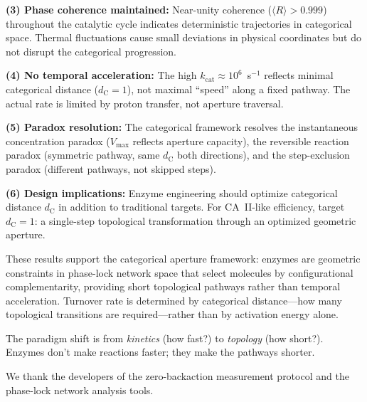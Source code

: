 \documentclass[twocolumn,amsmath,amssymb,aps,prb,superscriptaddress,longbibliography]{revtex4-2}
\newcommand{\dC}{d_{\mathrm{C}}}
\newcommand{\kcat}{k_{\mathrm{cat}}}
\newcommand{\Vmax}{V_{\mathrm{max}}}
\begin{document}
\textbf{(3) Phase coherence maintained:} Near-unity coherence ($\langle R \rangle > 0.999$) throughout the catalytic cycle indicates deterministic trajectories in categorical space. Thermal fluctuations cause small deviations in physical coordinates but do not disrupt the categorical progression.

\textbf{(4) No temporal acceleration:} The high $\kcat \approx 10^6$~s$^{-1}$ reflects minimal categorical distance ($\dC = 1$), not maximal ``speed'' along a fixed pathway. The actual rate is limited by proton transfer, not aperture traversal.

\textbf{(5) Paradox resolution:} The categorical framework resolves the instantaneous concentration paradox ($\Vmax$ reflects aperture capacity), the reversible reaction paradox (symmetric pathway, same $\dC$ both directions), and the step-exclusion paradox (different pathways, not skipped steps).

\textbf{(6) Design implications:} Enzyme engineering should optimize categorical distance $\dC$ in addition to traditional targets. For CA~II-like efficiency, target $\dC = 1$: a single-step topological transformation through an optimized geometric aperture.

These results support the categorical aperture framework: enzymes are geometric constraints in phase-lock network space that select molecules by configurational complementarity, providing short topological pathways rather than temporal acceleration. Turnover rate is determined by categorical distance---how many topological transitions are required---rather than by activation energy alone.

The paradigm shift is from \emph{kinetics} (how fast?) to \emph{topology} (how short?). Enzymes don't make reactions faster; they make the pathways shorter.

\begin{acknowledgments}
We thank the developers of the zero-backaction measurement protocol and the phase-lock network analysis tools.
\end{acknowledgments}



\end{document}
